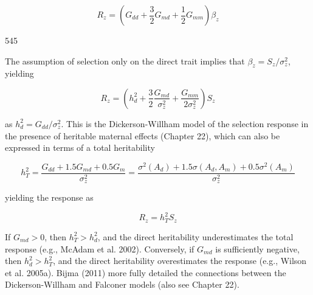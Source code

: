 \documentclass{article}
\begin{document}
\begin{equation}
R_{z}=\left(G_{d d}+\frac{3}{2}G_{m d}+\frac{1}{2}G_{m m}\right)\beta_{z}
\tag{15.38b}
\label{eq:15_38b}
\end{equation}

545

The assumption of selection only on the direct trait implies that  $ \beta_{z}=S_{z}/\sigma_{z}^{2} $, yielding

\begin{equation}
R_{z}=\left(h_{d}^{2}+\frac{3}{2}\frac{G_{m d}}{\sigma_{z}^{2}}+\frac{G_{m m}}{2\sigma_{z}^{2}}\right)S_{z}
\tag{15.38c}
\label{eq:15_38c}
\end{equation}

as  $ h_d^2 = G_{dd}/\sigma_z^2 $. This is the Dickerson-Willham model of the selection response in the presence of heritable maternal effects (Chapter 22), which can also be expressed in terms of a total heritability

\begin{equation}
h_{T}^{2}=\frac{G_{d d}+1.5G_{m d}+0.5G_{m}}{\sigma_{z}^{2}}=\frac{\sigma^{2}(A_{d})+1.5\sigma(A_{d},A_{m})+0.5\sigma^{2}(A_{m})}{\sigma_{z}^{2}}
\tag{15.38d}
\label{eq:15_38d}
\end{equation}

yielding the response as

\begin{equation}
R_{z}=h_{T}^{2}S_{z}
\tag{15.38e}
\label{eq:15_38e}
\end{equation}

If  $ G_{md} > 0 $, then  $ h_{T}^{2} > h_{d}^{2} $, and the direct heritability underestimates the total response (e.g., McAdam et al. 2002). Conversely, if  $ G_{md} $ is sufficiently negative, then  $ h_{d}^{2} > h_{T}^{2} $, and the direct heritability overestimates the response (e.g., Wilson et al. 2005a). Bijma (2011) more fully detailed the connections between the Dickerson-Willham and Falconer models (also see Chapter 22).
\end{document}
